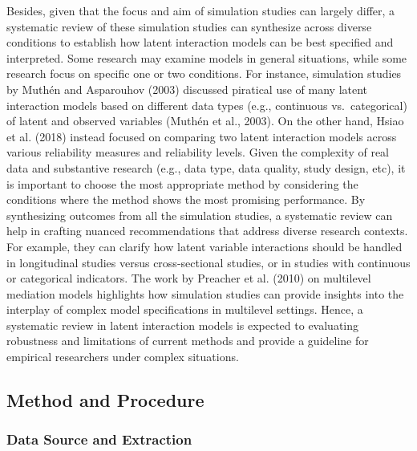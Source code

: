 \documentclass[
  11pt,
  man]{apa6}
\begin{document}
Besides, given that the focus and aim of simulation studies can largely differ, a systematic review of these simulation studies can synthesize across diverse conditions to establish how latent interaction models can be best specified and interpreted. Some research may examine models in general situations, while some research focus on specific one or two conditions. For instance, simulation studies by Muthén and Asparouhov (2003) discussed piratical use of many latent interaction models based on different data types (e.g., continuous vs.~categorical) of latent and observed variables (Muthén et al., 2003). On the other hand, Hsiao et al. (2018) instead focused on comparing two latent interaction models across various reliability measures and reliability levels. Given the complexity of real data and substantive research (e.g., data type, data quality, study design, etc), it is important to choose the most appropriate method by considering the conditions where the method shows the most promising performance. By synthesizing outcomes from all the simulation studies, a systematic review can help in crafting nuanced recommendations that address diverse research contexts. For example, they can clarify how latent variable interactions should be handled in longitudinal studies versus cross-sectional studies, or in studies with continuous or categorical indicators. The work by Preacher et al. (2010) on multilevel mediation models highlights how simulation studies can provide insights into the interplay of complex model specifications in multilevel settings. Hence, a systematic review in latent interaction models is expected to evaluating robustness and limitations of current methods and provide a guideline for empirical researchers under complex situations.

\hypertarget{method-and-procedure}{%
\subsection{Method and Procedure}\label{method-and-procedure}}

\hypertarget{data-source-and-extraction}{%
\subsubsection{Data Source and Extraction}\label{data-source-and-extraction}}
\end{document}
